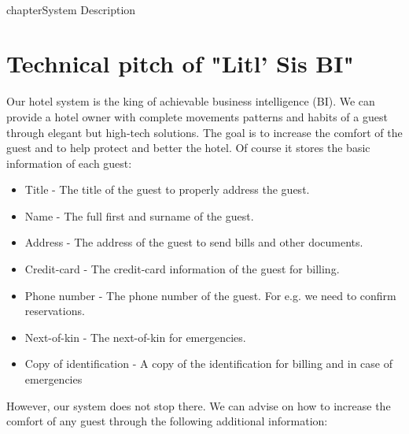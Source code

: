 \\chapter{System Description}
\label{chap:system_description}

\section{Technical pitch of "Litl' Sis BI"}
Our hotel system is the king of achievable business intelligence (BI). We can provide a hotel owner with complete movements patterns and habits of a guest through elegant but high-tech solutions. The goal is to increase the comfort of the guest and to help protect and better the hotel. Of course it stores the basic information of each guest:

\begin{itemize}
	\item Title - The title of the guest to properly address the guest.
	\item Name - The full first and surname of the guest.
	\item Address - The address of the guest to send bills and other documents.
	\item Credit-card - The credit-card information of the guest for billing.
	\item Phone number - The phone number of the guest. For e.g. we need to confirm reservations.
	\item Next-of-kin - The next-of-kin for emergencies.
	\item Copy of identification - A copy of the identification for billing and in case of emergencies
\end{itemize}

However, our system does not stop there. We can advise on how to increase the comfort of any guest through the following additional information:

